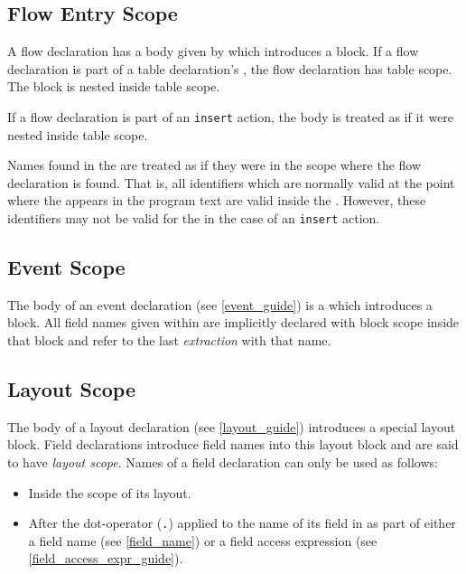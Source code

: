 \subsection{Flow Entry Scope} \label{flow_scope}

A flow declaration has a body given by  which introduces a block. If a flow declaration is part of a table declaration's , the flow declaration has table scope. The block is nested inside table scope.

If a flow declaration is part of an \texttt{insert} action, the body is treated as if it were nested inside table scope. 

Names found in the  are treated as if they were in the scope where the flow declaration is found. That is, all identifiers which are normally valid at the point where the  appears in the program text are valid inside the . However, these identifiers may not be valid for the  in the case of an \texttt{insert} action.

\subsection{Event Scope} \label{event_scope}

The body of an event declaration (see \ref{event_guide}) is a  which introduces a block. All field names given within  are implicitly declared with block scope inside that block and refer to the last \textit{extraction} with that name.

\subsection{Layout Scope} \label{layout_scope}

The body of a layout declaration (see \ref{layout_guide}) introduces a special layout block. Field declarations introduce field names into this layout block and are said to have \textit{layout scope}. Names of a field declaration can only be used as follows:

\begin{itemize}
\item Inside the scope of its layout.
\item After the dot-operator (\texttt{.}) applied to the name of its field in as part of either a field name (see \ref{field_name}) or a field access expression (see \ref{field_access_expr_guide}).
\end{itemize}

